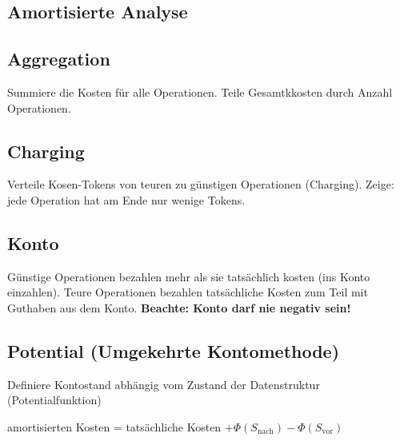 \documentclass[11pt, a4paper, twoside]{article}
\begin{document}
\begin{multicols}{2}
    \columnbreak
    \section{Amortisierte Analyse}

    \subsection{Aggregation}
    Summiere die Kosten für alle Operationen. Teile Gesamtkkosten durch Anzahl
    Operationen. 

    \subsection{Charging}
    Verteile Kosen-Tokens von teuren zu günstigen Operationen (Charging). Zeige:
    jede Operation hat am Ende nur wenige Tokens. 

    \subsection{Konto}
    Günstige Operationen bezahlen mehr als sie tatsächlich kosten (ins Konto
    einzahlen). Teure Operationen bezahlen tatsächliche Kosten zum Teil mit
    Guthaben aus dem Konto. \textbf{Beachte: Konto darf nie negativ sein!}

    \subsection{Potential (Umgekehrte Kontomethode)}
    Definiere Kontostand abhängig vom Zustand der Datenstruktur
    (Potentialfunktion)

    amortisierten Kosten = tatsächliche Kosten 
    $+ \Phi(S_\text{nach}) -\Phi(S_\text{vor})$

\end{multicols}
\end{document}
